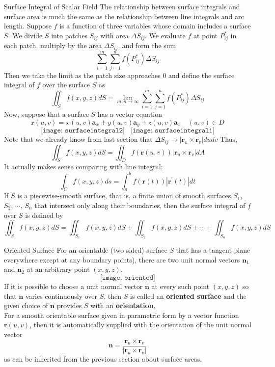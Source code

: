 \documentclass[10pt]{beamer}
\begin{document}
\begin{frame}[allowframebreaks]{Surface Integral of Scalar Field}
The relationship between surface integrals and surface area is much the same as the relationship
between line integrals and arc length. Suppose $f$ is a function of three variables
whose domain includes a surface $S$. We divide $S$ into patches $S_{ij}$ with area $\Delta S_{ij}$. We evaluate $f$ at point $P_{ij}^*$ in each patch, multiply by the area $\Delta S_{ij}$, and form the sum
$$\sum\limits_{i=1}^m\sum\limits_{j=1}^nf(P_{ij}^*)\Delta S_{ij}$$
Then we take the limit as the patch size approaches $0$ and define the surface integral of $f$
over the surface $S$ as
$$\iint_Sf(x,y,z)dS = \lim\limits_{m,n\rightarrow\infty}\sum\limits_{i=1}^m\sum\limits_{j=1}^nf(P_{ij}^*)\Delta S_{ij}$$$$$$
Now, suppose that a surface $S$ has a vector equation
$$\mathbf{r}(u,v) = x(u,v)\mathbf{a}_x + y(u,v)\mathbf{a}_y + z(u,v)\mathbf{a}_z~~~~~(u,v)\in D$$
$$\texttt{[image: surfaceintegral2]}~~~~\texttt{[image: surfaceintegral1]}$$
Note that we already know from last section that $\Delta S_{ij}\rightarrow|\mathbf{r}_u\times\mathbf{r}_v|dudv$
Thus, 
$$\iint_Sf(x,y,z)dS = \iint_Df(\mathbf{r}(u,v))|\mathbf{r}_u\times\mathbf{r}_v|dA$$
{\color{purple}
It actually makes sense comparing with line integral: $$\int_Cf(x,y,z)ds = \int_a^bf(\mathbf{r}(t))|\mathbf{r}^\prime(t)|dt$$}
If $S$ is a piecewise-smooth surface, that is, a finite union of smooth surfaces $S_1$, $S_2$, $\cdots$, $S_n$ that intersect only along their boundaries, then the surface integral of $f$ over $S$ is defined
by
$$\iint_Sf(x,y,z)dS = \iint_{S_1}f(x,y,z)dS + \iint_{S_2}f(x,y,z)dS + \cdots + \iint_{S_n}f(x,y,z)dS$$
\end{frame}



\begin{frame}[allowframebreaks]{Oriented Surface}
For an orientable (two-sided) surface $S$ that has a tangent plane everywhere except at any boundary points), there are two unit normal vectors $\mathbf{n}_1$ and $\mathbf{n}_2$ at an arbitrary point $(x,y,z)$.
$$\texttt{[image: oriented]}$$
If it is possible to choose a unit normal vector $\mathbf{n}$ at every such point $(x,y,z)$ so that $\mathbf{n}$ varies continuously over $S$, then $S$ is called an {\bf oriented surface} and the given choice of $\mathbf{n}$ provides $S$ with an {\bf orientation}.
\\For a smooth orientable surface given in {\color{red}parametric form} by a vector function $\mathbf{r}(u,v)$, then it is automatically supplied with the orientation of the unit normal vector
$$\mathbf{n} = \dfrac{\mathbf{r}_u \times\mathbf{r}_v}{|\mathbf{r}_u\times\mathbf{r}_v|}$$
as can be inherited from the previous section about surface areas.
	
\end{frame}
\end{document}
